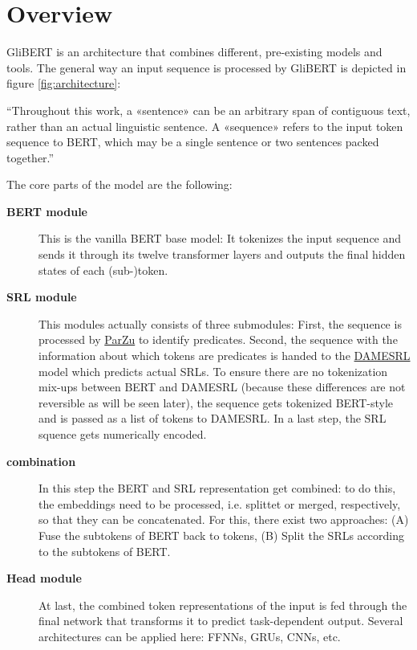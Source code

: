 
\label{chap:4_architecture}

\section{Overview}

GliBERT is an architecture that combines different, pre-existing models and tools.  The general
way an input sequence is processed by GliBERT is depicted in figure \ref{fig:architecture}:


``Throughout this work, a «sentence» can be an arbitrary span of contiguous text, rather
than an actual linguistic sentence. A «sequence» refers to the input token sequence to BERT,
which may be a single sentence or two sentences packed together.'' \citep{devlin2018bert}



The core parts of the model are the following:

\begin{description}
	\item[\textbf{BERT module}] This is the vanilla BERT base model: It tokenizes the input sequence and sends it through its twelve transformer layers and outputs the final hidden states of each (sub-)token.
  \item[\textbf{SRL module}] This modules actually consists of three submodules: First, the sequence is processed by \href{https://github.com/rsennrich/ParZu}{ParZu} \citep{sennrich2009new} to identify predicates.
	Second, the sequence with the information about which tokens are predicates is handed to the \href{https://liir.cs.kuleuven.be/software_pages/damesrl.php}{DAMESRL} model \citep{do2018flexible} which predicts actual SRLs.
	To ensure there are no tokenization mix-ups between BERT and DAMESRL (because these differences are not reversible as will be seen later), the sequence gets tokenized BERT-style and is passed as a list of tokens to DAMESRL. In a last step,
	the SRL squence gets numerically encoded.
  \item[\textbf{combination}] In this step the BERT and SRL representation get combined: to do this, the embeddings need to be processed, i.e. splittet or merged, respectively, so that they can be concatenated.
	For this, there exist two approaches:
	(A) Fuse the subtokens of BERT back to tokens, (B) Split the SRLs according to the subtokens of BERT.
  \item[\textbf{Head module}] At last, the combined token representations of the input is fed through the final network that transforms it to predict task-dependent output. Several architectures can be applied here: FFNNs, GRUs, CNNs, etc.
\end{description}

